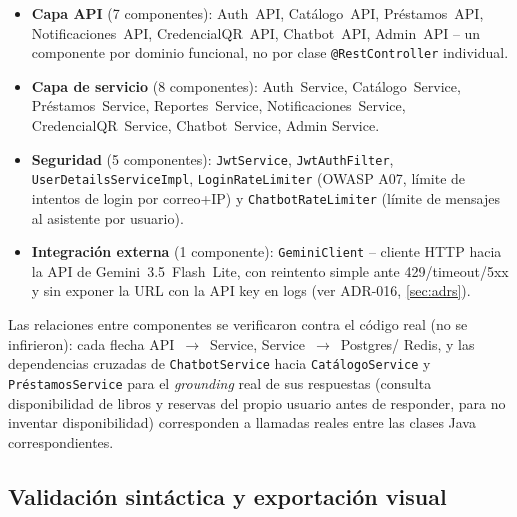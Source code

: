 \begin{itemize}[leftmargin=1.2cm]
  \item \textbf{Capa API} (7 componentes): Auth~API, Catálogo~API,
    Préstamos~API, Notificaciones~API, CredencialQR~API, Chatbot~API,
    Admin~API -- un componente por dominio funcional, no por clase
    \texttt{@RestController} individual.
  \item \textbf{Capa de servicio} (8 componentes): Auth~Service,
    Catálogo~Service, Préstamos~Service, Reportes~Service,
    Notificaciones~Service, CredencialQR~Service, Chatbot~Service, Admin
    Service.
  \item \textbf{Seguridad} (5 componentes): \texttt{JwtService},
    \texttt{JwtAuthFilter}, \texttt{UserDetailsServiceImpl},
    \texttt{LoginRateLimiter} (OWASP A07, límite de intentos de login por
    correo+IP) y \texttt{ChatbotRateLimiter} (límite de mensajes al
    asistente por usuario).
  \item \textbf{Integración externa} (1 componente): \texttt{GeminiClient}
    -- cliente HTTP hacia la API de Gemini~3.5~Flash~Lite, con reintento
    simple ante 429/timeout/5xx y sin exponer la URL con la API key en
    logs (ver ADR-016, \autoref{sec:adrs}).
\end{itemize}

Las relaciones entre componentes se verificaron contra el código real
(no se infirieron): cada flecha API~$\to$~Service, Service~$\to$~Postgres/
Redis, y las dependencias cruzadas de \texttt{ChatbotService} hacia
\texttt{CatálogoService} y \texttt{PréstamosService} para el
\emph{grounding} real de sus respuestas (consulta disponibilidad de
libros y reservas del propio usuario antes de responder, para no
inventar disponibilidad) corresponden a llamadas reales entre las
clases Java correspondientes.

\subsection*{Validación sintáctica y exportación visual}
\label{sec:c4-exportacion}

